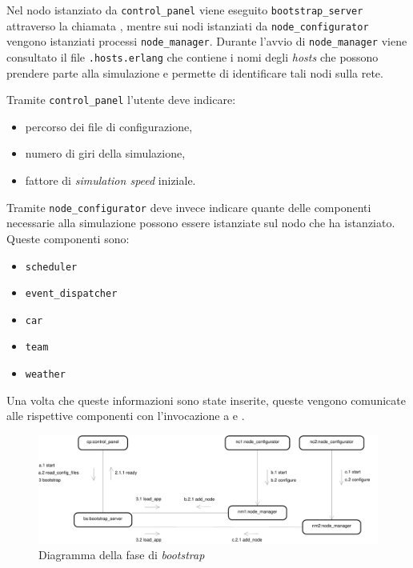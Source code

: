 Nel nodo \Erlang{} istanziato da \texttt{control\_panel} viene eseguito \texttt{bootstrap\_server} attraverso la chiamata , mentre sui nodi istanziati da \texttt{node\_configurator} vengono istanziati processi \texttt{node\_manager}. Durante l'avvio di \texttt{node\_manager} viene consultato il file \texttt{.hosts.erlang} che contiene i nomi degli \textit{hosts} che possono prendere parte alla simulazione e permette di identificare tali nodi sulla rete.

Tramite \texttt{control\_panel} l'utente deve indicare:
\begin{itemize}
\item percorso dei file di configurazione,
\item numero di giri della simulazione,
\item fattore di \textit{simulation speed} iniziale.
\end{itemize}

Tramite \texttt{node\_configurator} deve invece indicare quante delle componenti necessarie alla simulazione possono essere istanziate sul nodo \Erlang{} che ha istanziato. Queste componenti sono:
\begin{itemize}
\item \texttt{scheduler}
\item \texttt{event\_dispatcher}
\item \texttt{car}
\item \texttt{team}
\item \texttt{weather}
\end{itemize}

Una volta che queste informazioni sono state inserite, queste vengono comunicate alle rispettive componenti \Erlang{} con l'invocazione a  e .

\begin{landscape}
\begin{figure}
\includegraphics[height=.24\paperheight]{diagrammi/Bootstrap}
\caption{Diagramma della fase di \textit{bootstrap}}
\label{fig:bootstrap}
\end{figure}
\end{landscape}

